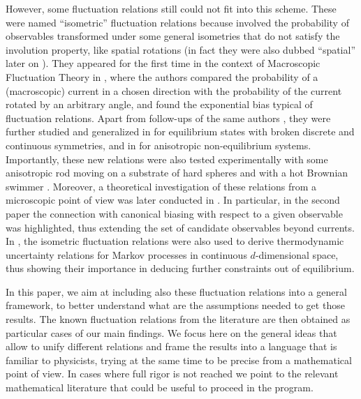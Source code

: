 \documentclass[a4paper,11pt]{article}
\numberwithin{equation}{section}
\begin{document}
However, some fluctuation relations still could not fit into this scheme. These were named ``isometric'' fluctuation relations because involved the probability of observables transformed under some general isometries that do not satisfy the involution property, like spatial rotations (in fact they were also dubbed ``spatial'' later on \cite{PRG15}). They appeared for the first time in the context of Macroscopic Fluctuation Theory in \cite{Hur+11}, where the authors compared the probability of a (macroscopic) current in a chosen direction with the probability of the current rotated by an arbitrary angle, and found the exponential bias typical of fluctuation relations. Apart from follow-ups of the same authors \cite{Hur+14}, they were further studied and generalized in \cite{LG14,LG15} for equilibrium states with broken discrete and continuous symmetries, and in \cite{VHT14,VH16} for anisotropic non-equilibrium systems. Importantly, these new relations were also tested experimentally with some anisotropic rod moving on a substrate of hard spheres \cite{Kum+15} and with a hot Brownian swimmer \cite{Fal+16}. Moreover, a theoretical investigation of these relations from a microscopic point of view was later conducted in \cite{PRG15,MPG20}. In particular, in the second paper the connection with canonical biasing with respect to a given observable was highlighted, thus extending the set of candidate observables beyond currents. In \cite{VPG20}, the isometric fluctuation relations were also used to derive thermodynamic uncertainty relations for Markov processes in continuous $d$-dimensional space, thus showing their importance in deducing further constraints out of equilibrium.



In this paper, we aim at including also these fluctuation relations into a general framework, to better understand what are the assumptions needed to get those results. The known fluctuation relations from the literature are then obtained as particular cases of our main findings. We focus here on the general ideas that allow to unify different relations and frame the results into a language that is familiar to physicists, trying at the same time to be precise from a mathematical point of view. In cases where full rigor is not reached we point to the relevant mathematical literature that could be useful to proceed in the program.
\end{document}
